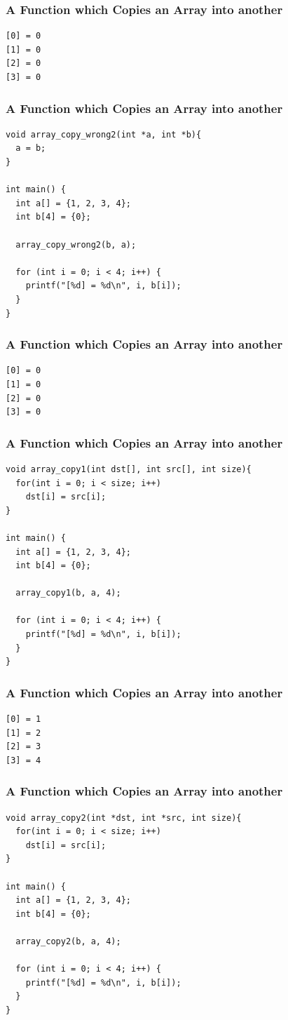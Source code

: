\documentclass{../c-lecture}
\begin{document}
\begin{frame}[fragile]
  \frametitle{A Function which Copies an Array into another}
  \begin{verbatim}
[0] = 0
[1] = 0
[2] = 0
[3] = 0
  \end{verbatim}
\end{frame}

\begin{frame}[fragile]
  \frametitle{A Function which Copies an Array into another}
  \begin{verbatim}
void array_copy_wrong2(int *a, int *b){
  a = b;
}

int main() {
  int a[] = {1, 2, 3, 4};
  int b[4] = {0};

  array_copy_wrong2(b, a);

  for (int i = 0; i < 4; i++) {
    printf("[%d] = %d\n", i, b[i]);
  }
}
  \end{verbatim}
\end{frame}

\begin{frame}[fragile]
  \frametitle{A Function which Copies an Array into another}
  \begin{verbatim}
[0] = 0
[1] = 0
[2] = 0
[3] = 0
  \end{verbatim}
\end{frame}

\begin{frame}[fragile]
  \frametitle{A Function which Copies an Array into another}
  \scriptsize
  \begin{verbatim}
void array_copy1(int dst[], int src[], int size){
  for(int i = 0; i < size; i++)
    dst[i] = src[i];
}

int main() {
  int a[] = {1, 2, 3, 4};
  int b[4] = {0};

  array_copy1(b, a, 4);

  for (int i = 0; i < 4; i++) {
    printf("[%d] = %d\n", i, b[i]);
  }
}
  \end{verbatim}
\end{frame}

\begin{frame}[fragile]
  \frametitle{A Function which Copies an Array into another}
  \begin{verbatim}
[0] = 1
[1] = 2
[2] = 3
[3] = 4
  \end{verbatim}
\end{frame}

\begin{frame}[fragile]
  \frametitle{A Function which Copies an Array into another}
  \scriptsize
  \begin{verbatim}
void array_copy2(int *dst, int *src, int size){
  for(int i = 0; i < size; i++)
    dst[i] = src[i];
}

int main() {
  int a[] = {1, 2, 3, 4};
  int b[4] = {0};

  array_copy2(b, a, 4);

  for (int i = 0; i < 4; i++) {
    printf("[%d] = %d\n", i, b[i]);
  }
}
  \end{verbatim}
\end{frame}
\end{document}

